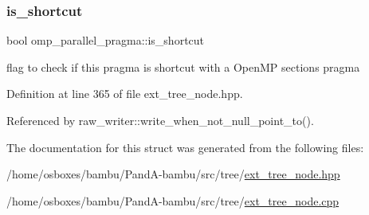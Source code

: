 \mbox{\label{structomp__parallel__pragma_ab94eeb452812ad9c48259fa3ecd5a6fa}} 
\subsubsection{\texorpdfstring{is\+\_\+shortcut}{is\_shortcut}}
{\footnotesize\ttfamily bool omp\+\_\+parallel\+\_\+pragma\+::is\+\_\+shortcut}



flag to check if this pragma is shortcut with a Open\+MP sections pragma 



Definition at line 365 of file ext\+\_\+tree\+\_\+node.\+hpp.



Referenced by raw\+\_\+writer\+::write\+\_\+when\+\_\+not\+\_\+null\+\_\+point\+\_\+to().



The documentation for this struct was generated from the following files\+:\begin{DoxyCompactItemize}
\item 
/home/osboxes/bambu/\+Pand\+A-\/bambu/src/tree/\hyperlink{ext__tree__node_8hpp}{ext\+\_\+tree\+\_\+node.\+hpp}\item 
/home/osboxes/bambu/\+Pand\+A-\/bambu/src/tree/\hyperlink{ext__tree__node_8cpp}{ext\+\_\+tree\+\_\+node.\+cpp}\end{DoxyCompactItemize}
